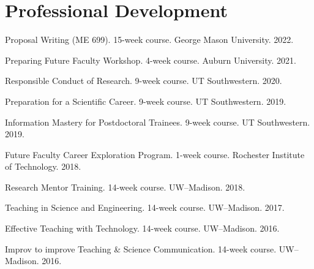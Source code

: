 \documentclass[letterpaper, 10pt]{article}
\begin{document}
\section{Professional Development}
\begin{compactenum}
	\item Proposal Writing (ME 699). 15-week course. George Mason University. 2022.
	\item Preparing Future Faculty Workshop. 4-week course. Auburn University. 2021.
	\item Responsible Conduct of Research. 9-week course. UT Southwestern. 2020.
	\item Preparation for a Scientific Career. 9-week course. UT Southwestern. 2019.
	\item Information Mastery for Postdoctoral Trainees. 9-week course. UT Southwestern. 2019.
	\item Future Faculty Career Exploration Program. 1-week course. Rochester Institute of Technology. 2018.
	\item Research Mentor Training. 14-week course. UW--Madison. 2018.
	\item Teaching in Science and Engineering. 14-week course. UW--Madison. 2017.
	\item Effective Teaching with Technology. 14-week course. UW--Madison. 2016.
	\item Improv to improve Teaching \& Science Communication. 14-week course. UW--Madison. 2016.
\end{compactenum}

%
%
\end{document}
